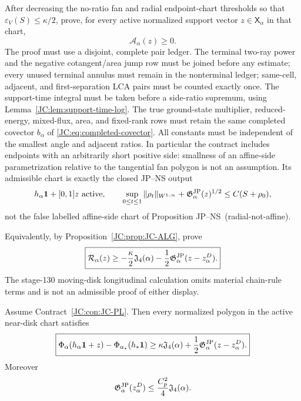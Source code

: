 \begin{contract}
\label{JC:con:JC-PL}
After decreasing the no-ratio fan and radial endpoint-chart thresholds so that
$\varepsilon_V(S)\le\kappa/2$, prove, for every active normalized support
vector $z\in\mathsf X_\alpha$ in that chart,
\begin{equation}\label{JC:eq:JC-PL}
 \boxed{\mathscr A_\alpha(z)\ge0.}
\end{equation}
The proof must use a disjoint, complete pair ledger.  The terminal two-ray
power and the negative cotangent/area jump row must be joined before any
estimate; every unused terminal annulus must remain in the nonterminal
ledger; same-cell, adjacent, and first-separation LCA pairs must be counted
exactly once.  The support-time integral must be taken before a side-ratio
supremum, using Lemma~\ref{JC:lem:support-time-log}.  The true ground-state
multiplier, reduced-energy, mixed-flux, area, and fixed-rank rows must
retain the same completed covector $b_\alpha$ of
\eqref{JC:eq:completed-covector}.  All constants must be independent of the
smallest angle and adjacent ratios.  In particular the contract includes
endpoints with an arbitrarily short positive side: smallness of an
affine-side parametrization relative to the tangential fan polygon is not
an assumption.  Its admissible chart is exactly the closed JP--NS output
\[
 h_\alpha\mathbf1+[0,1]z\ \hbox{active},\qquad
 \sup_{0\le t\le1}\|\rho_t\|_{W^{1,\infty}}
 +\Gjp_\alpha(z)^{1/2}\le C(S+\rho_0),
\]
not the false labelled affine-side chart of
Proposition JP--NS~\textup{(radial-not-affine)}.

Equivalently, by Proposition~\ref{JC:prop:JC-ALG}, prove
\begin{equation}\label{JC:eq:JC}
\boxed{
 \mathcal{R}_\alpha(z)
 \ge-\frac\kappa2\mathfrak J_4(\alpha)
      -\frac12\mathfrak G^{\rm JP}_\alpha(z-z_\alpha^D).}
\end{equation}
The stage-130 moving-disk longitudinal calculation omits material
chain-rule terms and is not an admissible proof of either display.
\end{contract}

\begin{theorem}\label{JC:thm:JC-to-J0}
Assume Contract~\ref{JC:con:JC-PL}.  Then every normalized polygon in the active
near-disk chart satisfies
\begin{equation}\label{JC:eq:J0}
\boxed{
 \Phi_\alpha(h_\alpha\mathbf1+z)
 -\Phi_{\alpha_*}(h_*\mathbf1)
 \ge\kappa\mathfrak J_4(\alpha)
      +\frac12\mathfrak G^{\rm JP}_\alpha(z-z_\alpha^D).}
\end{equation}
Moreover
\begin{equation}\label{JC:eq:corrector-bound}
 \mathfrak G^{\rm JP}_\alpha(z_\alpha^D)
 \le\frac{C_p^2}{4}\mathfrak J_4(\alpha).
\end{equation}
\end{theorem}

